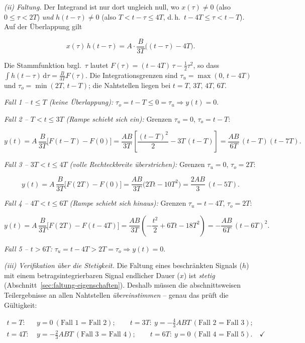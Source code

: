 \begin{beispiel}
\emph{(ii) Faltung.} Der Integrand ist nur dort ungleich null, wo $x(\tau) \neq 0$
(also $0 \leq \tau < 2T$) \emph{und} $h(t - \tau) \neq 0$ (also
$T < t - \tau \leq 4T$, d.\,h.\ $t - 4T \leq \tau < t - T$). Auf der Überlappung
gilt

$$
x(\tau)\,h(t - \tau) = A\cdot\frac{B}{3T}\big((t - \tau) - 4T\big).
$$

Die Stammfunktion bzgl.\ $\tau$ lautet
$F(\tau) = (t - 4T)\,\tau - \tfrac{1}{2}\tau^2$, so dass
$\int h(t-\tau)\,\mathrm{d}\tau = \tfrac{B}{3T}F(\tau)$. Die Integrationsgrenzen
sind $\tau_u = \max(0,\, t - 4T)$ und $\tau_o = \min(2T,\, t - T)$; die
Nahtstellen liegen bei $t = T,\, 3T,\, 4T,\, 6T$.

\medskip
\textit{Fall 1 -- $t \leq T$ (keine Überlappung):}
$\tau_o = t - T \leq 0 = \tau_u \Rightarrow y(t) = 0$.

\medskip
\textit{Fall 2 -- $T < t \leq 3T$ (Rampe schiebt sich ein):}
Grenzen $\tau_u = 0$, $\tau_o = t - T$:

$$
y(t) = A\,\frac{B}{3T}\Big[F(t-T) - F(0)\Big]
= \frac{AB}{3T}\left[\frac{(t-T)^2}{2} - 3T\,(t-T)\right]
= \frac{AB}{6T}\,(t - T)(t - 7T).
$$

\medskip
\textit{Fall 3 -- $3T < t \leq 4T$ (volle Rechteckbreite überstrichen):}
Grenzen $\tau_u = 0$, $\tau_o = 2T$:

$$
y(t) = A\,\frac{B}{3T}\Big[F(2T) - F(0)\Big]
= \frac{AB}{3T}\big(2Tt - 10T^2\big)
= \frac{2AB}{3}\,(t - 5T).
$$

\medskip
\textit{Fall 4 -- $4T < t \leq 6T$ (Rampe schiebt sich hinaus):}
Grenzen $\tau_u = t - 4T$, $\tau_o = 2T$:

$$
y(t) = A\,\frac{B}{3T}\Big[F(2T) - F(t - 4T)\Big]
= \frac{AB}{3T}\left(-\frac{t^2}{2} + 6Tt - 18T^2\right)
= -\frac{AB}{6T}\,(t - 6T)^2.
$$

\medskip
\textit{Fall 5 -- $t > 6T$:} $\tau_u = t - 4T > 2T = \tau_o \Rightarrow y(t) = 0$.

\emph{(iii) Verifikation über die Stetigkeit.} Die Faltung eines beschränkten
Signals ($h$) mit einem betragsintegrierbaren Signal endlicher Dauer ($x$) ist
\emph{stetig} (Abschnitt~\ref{sec:faltung-eigenschaften}). Deshalb müssen die
abschnittsweisen Teilergebnisse an allen Nahtstellen \emph{übereinstimmen} --
genau das prüft die Gültigkeit:

$$
\begin{aligned}
t = T:\ & y = 0 \ (\text{Fall 1 = Fall 2}); \qquad
t = 3T:\ y = -\tfrac{4}{3}ABT \ (\text{Fall 2 = Fall 3}); \\
t = 4T:\ & y = -\tfrac{2}{3}ABT \ (\text{Fall 3 = Fall 4}); \qquad
t = 6T:\ y = 0 \ (\text{Fall 4 = Fall 5}). \quad\checkmark
\end{aligned}
$$


\end{beispiel}
